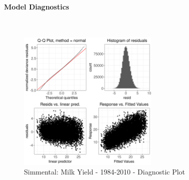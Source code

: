 \paragraph{Model Diagnostics} \quad \\
\begin{figure}[H]
    \centering
    \includegraphics[width=0.6\textwidth]{thesis/figures/models/milk/before2010/si_milk_before2010/si_milk_before2010_diagnostics.png}
    \caption[]{Simmental: Milk Yield - 1984-2010 - Diagnostic Plot}
\end{figure}

\newpage
